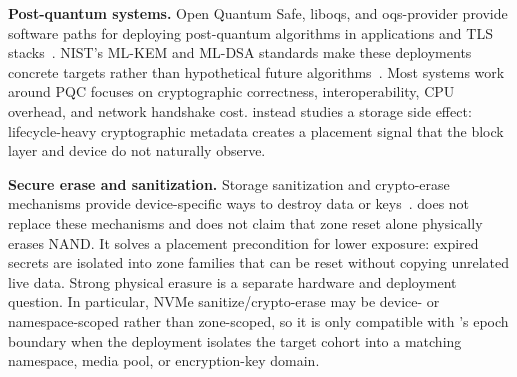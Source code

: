 \noindent\textbf{Post-quantum systems.}
Open Quantum Safe, liboqs, and oqs-provider provide software paths for deploying post-quantum algorithms in applications and TLS stacks~\cite{liboqs,oqsprovider}.  NIST's ML-KEM and ML-DSA standards make these deployments concrete targets rather than hypothetical future algorithms~\cite{nist-fips203,nist-fips204}.  Most systems work around PQC focuses on cryptographic correctness, interoperability, CPU overhead, and network handshake cost.  \system instead studies a storage side effect: lifecycle-heavy cryptographic metadata creates a placement signal that the block layer and device do not naturally observe.

\noindent\textbf{Secure erase and sanitization.}
Storage sanitization and crypto-erase mechanisms provide device-specific ways to destroy data or keys~\cite{nvme-sanitize,nist-sp80088r2}.  \system does not replace these mechanisms and does not claim that zone reset alone physically erases NAND.  It solves a placement precondition for lower exposure: expired secrets are isolated into zone families that can be reset without copying unrelated live data.  Strong physical erasure is a separate hardware and deployment question.  In particular, NVMe sanitize/crypto-erase may be device- or namespace-scoped rather than zone-scoped, so it is only compatible with \system's epoch boundary when the deployment isolates the target cohort into a matching namespace, media pool, or encryption-key domain.
